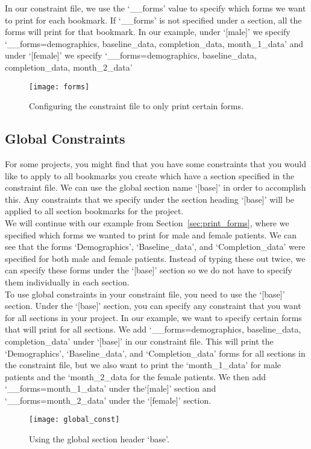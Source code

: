 \documentclass[12pt]{article}
\begin{document}
	In our constraint file, we use the `\_\_forms' value to specify which forms we want to print for each bookmark. If `\_\_forms' is not specified under a section, all the forms will print for that bookmark. In our example, under `[male]' we specify `\_\_forms=demographics, baseline\_data, completion\_data, month\_1\_data' and under `[female]' we specify `\_\_forms=demographics, baseline\_data, completion\_data, month\_2\_data' 
 	\begin{figure}[H]
            
            \centering
            \texttt{[image: forms]}
            \caption{Configuring the constraint file to only print certain forms.}
	    \label{fig:const_bookmark}
	\end{figure}

    \subsection{Global Constraints}
    	For some projects, you might find that you have some constraints that you would like to apply to all bookmarks you create which have a section specified in the constraint file. We can use the global section name `[base]' in order to accomplish this. Any constraints that we specify under the section heading `[base]' will be applied to all section bookmarks for the project.
\\

    	We will continue with our example from Section~\ref{sec:print_forms}, where we specified which forms we wanted to print for male and female patients. We can see that the forms `Demographics', `Baseline\_data', and `Completion\_data' were specified for both male and female patients. Instead of typing these out twice, we can specify these forms under the `[base]' section so we do not have to specify them individually in each section. 
\\

	To use global constraints in your constraint file, you need to use the `[base]' section. Under the `[base]' section, you can specify any constraint that you want for all sections in your project. In our example, we want to specify certain forms that will print for all sections. We add  `\_\_forms=demographics, baseline\_data, completion\_data' under `[base]' in our constraint file. This will print the `Demographics', `Baseline\_data', and `Completion\_data' forms for all sections in the constraint file, but we also want to print the `month\_1\_data' for male patients and the `month\_2\_data for the female patients. We then add `\_\_forms=month\_1\_data' under the`[male]' section and `\_\_forms=month\_2\_data' under the `[female]' section.	
	\begin{figure}[H]
            \centering
            \texttt{[image: global\_const]}
            \caption{Using the global section header `base'.}
            \label{fig:global_const}
	\end{figure}
\end{document}
